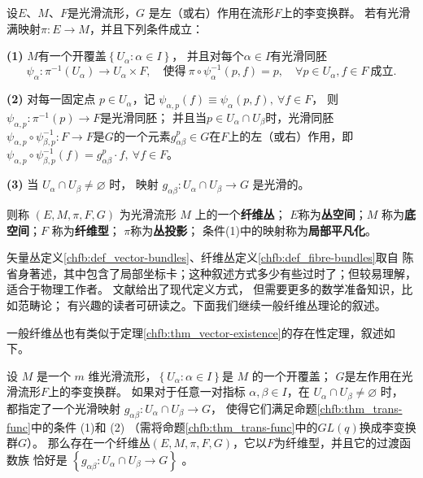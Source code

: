 \begin{definition}\label{chfb:def_fibre-bundles}
    设$E$、$ M$、$ F$是光滑流形，$G$ 是左（或右）作用在流形$F$上的李变换群。
    若有光滑满映射$\pi: E \rightarrow M$，并且下列条件成立：
    
    {\bfseries (1)} $M$有一个开覆盖$\left\{U_\alpha: \alpha \in I\right\}$，
    并且对每个$\alpha \in I$有光滑同胚
    \begin{equation*}
        \psi_\alpha: \pi^{-1}(U_\alpha) \to U_\alpha \times F,
        \quad \text{使得}\ 
        \pi \circ \psi_\alpha^{-1}(p, f)=p, \quad \forall p \in U_\alpha, f \in F 
        \ \text{成立}.
    \end{equation*}
    
    {\bfseries (2)} 对每一固定点 $p \in U_\alpha$，记
    $\psi_{\alpha, p}(f)\equiv \psi_\alpha(p, f), \ \forall f \in F$，
    则 $\psi_{\alpha, p}: \pi^{-1}(p)\to F$是光滑同胚；
    并且当$p \in U_\alpha \cap U_\beta$时，光滑同胚$\psi_{\alpha, p}\circ \psi_{\beta, p}^{-1}:
    F \rightarrow F$是$G$的一个元素$g_{\alpha \beta}^p\in G$在$F$上的左（或右）作用，即
    $\psi_{\alpha, p} \circ \psi_{\beta, p}^{-1}(f)=g^p_{\alpha \beta} \cdot f, 
    \ \forall f \in F$。
    
    
    {\bfseries (3)} 当 $U_\alpha \cap U_\beta \neq \varnothing$ 时，
    映射 $g_{\alpha \beta}: U_\alpha \cap U_\beta \rightarrow G$ 是光滑的。
    
    则称 $(E, M, \pi, F, G)$ 为光滑流形 $M$ 上的一个\textbf{纤维丛}；
    $E$称为\textbf{丛空间}；$M$ 称为\textbf{底空间}；$F$ 称为\textbf{纤维型}；
    $\pi$称为\textbf{丛投影}；
    条件(1)中的映射称为\textbf{局部平凡化}。
\end{definition}

矢量丛定义\ref{chfb:def_vector-bundles}、纤维丛定义\ref{chfb:def_fibre-bundles}取自
陈省身著述，其中包含了局部坐标卡；这种叙述方式多少有些过时了；但较易理解，适合于物理工作者。
文献\parencite{Husemoller-1994}给出了现代定义方式，%
但需要更多的数学准备知识，比如范畴论；
有兴趣的读者可研读之。下面我们继续一般纤维丛理论的叙述。

一般纤维丛也有类似于定理\ref{chfb:thm_vector-existence}的存在性定理，叙述如下。

\begin{theorem}\label{chfb:thm_fb-existence}
    设 $M$ 是一个 $m$ 维光滑流形，$\left\{U_\alpha: \alpha \in I\right\}$是 $M$ 的一个开覆盖；
    $G$是左作用在光滑流形$F$上的李变换群。
    如果对于任意一对指标 $\alpha, \beta \in I$，在 $U_\alpha \cap U_\beta \neq \varnothing$ 时，
    都指定了一个光滑映射 $g_{\alpha \beta}: U_\alpha \cap U_\beta \rightarrow G$，
    使得它们满足命题\ref{chfb:thm_trans-func}中的条件 (1)和 (2)
    （需将命题\ref{chfb:thm_trans-func}中的$GL(q)$换成李变换群$G$）。
    那么存在一个纤维丛$(E,M,\pi,F,G)$，它以$F$为纤维型，并且它的过渡函数族
    恰好是 $\left\{g_{\alpha \beta}: U_\alpha \cap U_\beta \rightarrow G\right\}$ 。
\end{theorem}

